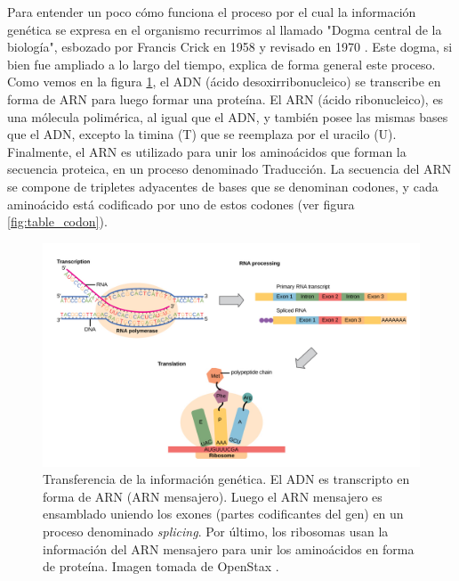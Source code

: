 Para entender un poco cómo funciona el proceso por el cual la información genética se expresa en el organismo recurrimos al llamado "Dogma central de la biología", esbozado por Francis Crick en 1958 \cite{CRICK1958} y revisado en 1970 \cite{CRICK1970}. Este dogma, si bien fue ampliado a lo largo del tiempo, explica de forma general este proceso. Como vemos en la figura \ref{fig:esquema_dogma}, el ADN (ácido desoxirribonucleico) se transcribe en forma de ARN para luego formar una proteína. El ARN (ácido ribonucleico), es una mólecula polimérica, al igual que el ADN, y también posee las mismas bases que el ADN, excepto la timina (T) que se reemplaza por el uracilo (U). Finalmente, el ARN es utilizado para unir los aminoácidos que forman la secuencia proteica, en un proceso denominado Traducción. La secuencia del ARN se compone de tripletes adyacentes de bases que se denominan codones, y cada aminoácido está codificado por uno de estos codones (ver figura \ref{fig:table_codon}). 

\newpage

\begin{figure}[H]
\centering
    \includegraphics[width=\textwidth]{documents/latex/figures/1/dogma.png}
    \caption{Transferencia de la información genética. El ADN es transcripto en forma de ARN (ARN mensajero). Luego el ARN mensajero es ensamblado uniendo los exones (partes codificantes del gen) en un proceso denominado \textit{splicing}. Por último, los ribosomas usan la información del ARN mensajero para unir los aminoácidos en forma de proteína. Imagen tomada de OpenStax \cite{OpenStaxCNX}.}
    \label{fig:esquema_dogma}
\end{figure}

